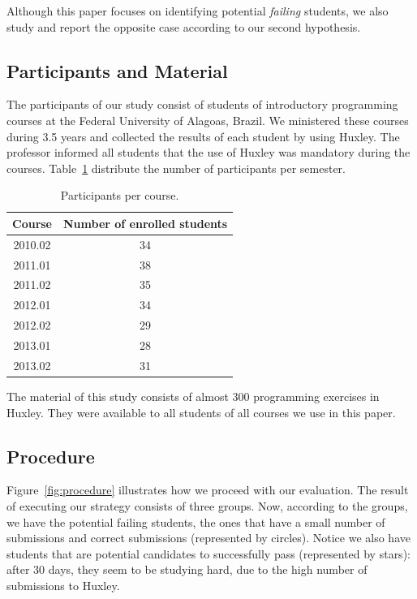 Although this paper focuses on identifying potential \textit{failing} students, we also study and report the opposite case according to our second hypothesis.

\subsection{Participants and Material}

The participants of our study consist of students of introductory programming courses at the Federal University of Alagoas, Brazil. We ministered these courses during 3.5 years and collected the results of each student by using Huxley. The professor informed all students that the use of Huxley was mandatory during the courses. Table~\ref{tab:participants} distribute the number of participants per semester.

\begin{table}[h]
\centering
\begin{tabular}{|c|c|}
\hline
\textbf{Course} & \textbf{Number of enrolled students}\\ \hline
2010.02 & 34\\ \hline
2011.01 & 38\\ \hline
2011.02 & 35\\ \hline
2012.01 & 34\\ \hline
2012.02 & 29\\ \hline
2013.01 & 28\\ \hline
2013.02 & 31\\ \hline
\end{tabular}
\caption{Participants per course.}
\label{tab:participants}
\end{table}

The material of this study consists of almost 300 programming exercises in Huxley. They were available to all students of all courses we use in this paper.

\subsection{Procedure}

\label{sec:procedure}

Figure~\ref{fig:procedure} illustrates how we proceed with our evaluation. The result of executing our strategy consists of three groups. Now, according to the groups, we have the potential failing students, the ones that have a small number of submissions and correct submissions (represented by circles). Notice we also have students that are potential candidates to successfully pass (represented by stars): after 30 days, they seem to be studying hard, due to the high number of submissions to Huxley.

